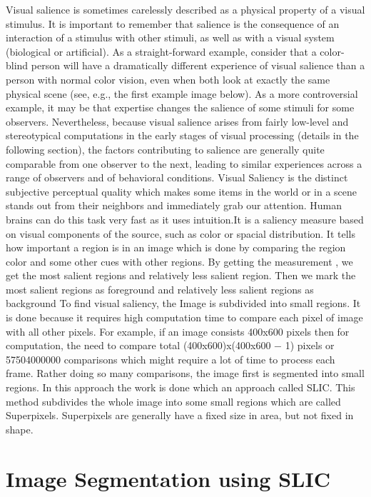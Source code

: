 Visual salience is sometimes carelessly described as a physical property of a visual stimulus. It is important to remember that salience is the consequence of an interaction of a stimulus with other stimuli, as well as with a visual system (biological or artificial). As a straight-forward example, consider that a color-blind person will have a dramatically different experience of visual salience than a person with normal color vision, even when both look at exactly the same physical scene (see, e.g., the first example image below). As a more controversial example, it may be that expertise changes the salience of some stimuli for some observers. Nevertheless, because visual salience arises from fairly low-level and stereotypical computations in the early stages of visual processing (details in the following section), the factors contributing to salience are generally quite comparable from one observer to the next, leading to similar experiences across a range of observers and of behavioral conditions.
\noindent
Visual Saliency is the distinct subjective perceptual quality which makes some items in the world or in a scene stands out from their neighbors and immediately grab our attention. Human brains can do this task very fast as it uses intuition.It is a saliency measure based on visual components of the source, such as color or spacial distribution. It tells how important a region is in an image which is done by comparing the region color and some other cues with other regions. By getting the measurement , we get the most salient regions and relatively less salient region. Then we mark the most salient regions as foreground and relatively less salient regions as background
To find visual saliency, the Image is subdivided into small regions.  It is done because it requires high computation time to compare each pixel of image with all other pixels. For example, if an image consists 400x600 pixels then for computation, the need to compare total (400x600)x(400x600 − 1) pixels or 57504000000 comparisons which might require a lot of time to process each frame. Rather doing so many comparisons, the image first is segmented into small regions. In this approach the work is done which an approach called SLIC\cite{achanta2012slic}.  This method subdivides the whole image into some small regions which are called Superpixels. Superpixels are generally have a fixed size in area, but not fixed in shape.



\section{Image Segmentation using SLIC}


